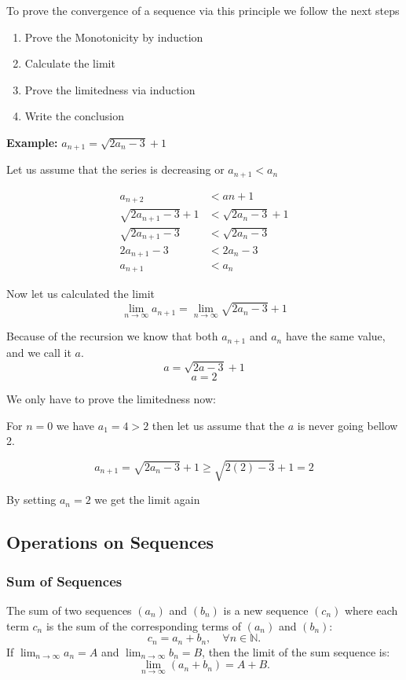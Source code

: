 To prove the convergence of a sequence via this principle we follow the next steps

\begin{enumerate}
    \item Prove the Monotonicity by induction
    \item Calculate the limit
    \item Prove the limitedness via induction
    \item Write the conclusion
\end{enumerate}

\textbf{Example: } \(a_{n + 1} = \sqrt{2a_n - 3} + 1\)

Let us assume that the series is decreasing or \(a_{n + 1} < a_{n}\)

\begin{align*}
    a_{n + 2} &< a{n + 1} \\
    \sqrt{2a_{n + 1} -3} + 1 &< \sqrt{2a_{n} - 3} + 1 \\
    \sqrt{2a_{n + 1} -3} &< \sqrt{2a_{n} - 3} \\
    2a_{n + 1} - 3 &< 2a_{n} - 3 \\
    a_{n + 1} &< a_{n}
\end{align*}
\QED

Now let us calculated the limit
\[
\lim_{n \rightarrow \infty} a_{n + 1} = \lim_{n \rightarrow \infty} \sqrt{2a_n - 3} + 1
\]

Because of the recursion we know that both \(a_{n + 1}\) and \(a_n\) have the same value, 
and we call it \(a\).
\[
a = \sqrt{2a -3} +1
\]
\[
a = 2
\]

We only have to prove the limitedness now:

For \(n = 0\) we have \(a_1 = 4 > 2\) then let us assume that the \(a\) is never going bellow 2.

\[
a_{n + 1} = \sqrt{2a_n - 3} + 1 \ge \sqrt{2(2) - 3} + 1 = 2
\]

By setting \(a_n = 2\) we get the limit again

\QED

\subsection{Operations on Sequences}

\subsubsection{Sum of Sequences}
The sum of two sequences \((a_n)\) and \((b_n)\) is a new sequence \((c_n)\) where each term \(c_n\) is the sum of the corresponding terms of \((a_n)\) and \((b_n)\):
\[
c_n = a_n + b_n, \quad \forall n \in \mathbb{N}.
\]
If \(\lim_{n \to \infty} a_n = A\) and \(\lim_{n \to \infty} b_n = B\), then the limit of the sum sequence is:
\[
\lim_{n \to \infty} (a_n + b_n) = A + B.
\]


